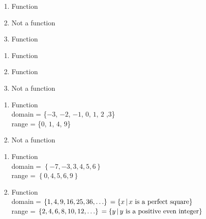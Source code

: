 \begin{multicols}{3}
\begin{enumerate}
\setcounter{enumi}{\value{HW}}

\item   Function
\item   Not a function
\item Function

\setcounter{HW}{\value{enumi}}
\end{enumerate}
\end{multicols}

\begin{multicols}{3}
\begin{enumerate}
\setcounter{enumi}{\value{HW}}

\item Function
\item  Function
\item Not a function

\setcounter{HW}{\value{enumi}}
\end{enumerate}
\end{multicols}


\begin{multicols}{2}
\begin{enumerate}
\setcounter{enumi}{\value{HW}}

\item Function \\ domain = \{$-3$, $-2$, $-1$, $0$, $1$, $2$ ,$3$\} \\ range = \{$0$, $1$, $4$, $9$\}

\vfill

\columnbreak

\item Not a function

\setcounter{HW}{\value{enumi}}
\end{enumerate}
\end{multicols}

\begin{multicols}{2}
\begin{enumerate}
\setcounter{enumi}{\value{HW}}

\item  Function \\ domain = $\left\{ -7, -3, 3, 4, 5, 6 \right\}$ \\ range = $\left\{ 0,4,5,6,9 \right\}$


\vfill

\columnbreak

\item  Function \\ domain =   $\left\{ 1, 4, 9, 16, 25, 36, \ldots \right\} \\ = \left\{ x \, | \, \text{$x$ is a perfect square} \right\}$ \\ range =  $\left\{ 2, 4, 6, 8, 10, 12, \ldots \right\} \\ = \left\{ y \, | \, \text{$y$ is a positive even integer} \right\}$

\setcounter{HW}{\value{enumi}}
\end{enumerate}
\end{multicols}

